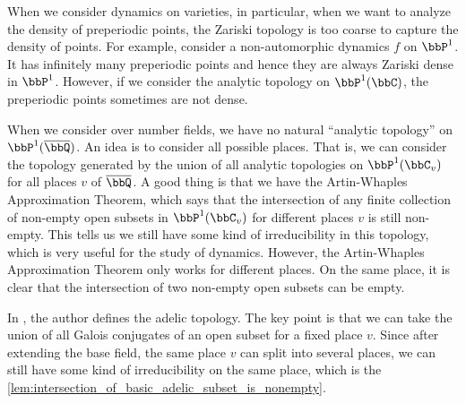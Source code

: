     \begin{remark}\label{rmk:motivation_of_adelic_topology}
        When we consider dynamics on varieties, in particular, when we want to analyze the density of preperiodic points, 
        the Zariski topology is too coarse to capture the density of points.
        For example, consider a non-automorphic dynamics \(f\) on \(\bbP^1\).
        It has infinitely many preperiodic points and hence they are always Zariski dense in \(\bbP^1\).
        However, if we consider the analytic topology on \(\bbP^1(\bbC)\), the preperiodic points sometimes are not dense.

        When we consider over number fields, we have no natural ``analytic topology'' on \(\bbP^1(\overline{\bbQ})\).
        An idea is to consider all possible places.
        That is, we can consider the topology generated by the union of all analytic topologies on \(\bbP^1(\bbC_v)\) for all places \(v\) of \(\overline{\bbQ}\).
        A good thing is that we have the Artin-Whaples Approximation Theorem, which says that the intersection of any finite collection of non-empty open subsets in \(\bbP^1(\bbC_v)\) for different places \(v\) is still non-empty.
        This tells us we still have some kind of irreducibility in this topology, which is very useful for the study of dynamics.
        However, the Artin-Whaples Approximation Theorem only works for different places.
        On the same place, it is clear that the intersection of two non-empty open subsets can be empty.

        In \cite{Xie25ZDOsurfaces}, the author defines the adelic topology.
        The key point is that we can take the union of all Galois conjugates of an open subset for a fixed place \(v\).
        Since after extending the base field, the same place \(v\) can split into several places, we can still have some kind of irreducibility on the same place, which is the \cref{lem:intersection_of_basic_adelic_subset_is_nonempty}.
    \end{remark}
    
